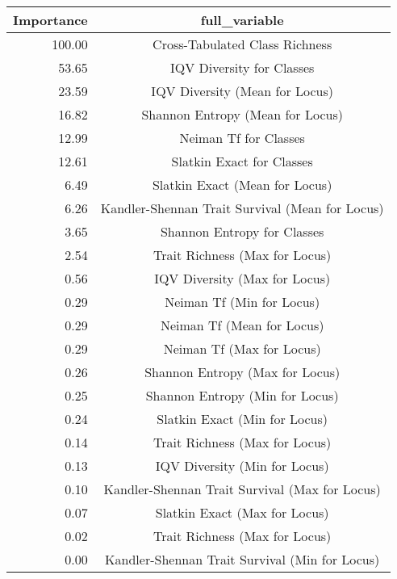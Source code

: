 \begin{tabular}{|r|c|}
  \hline
Importance & full\_variable \\ 
  \hline
100.00 & Cross-Tabulated Class Richness \\ 
  53.65 & IQV Diversity for Classes \\ 
  23.59 & IQV Diversity (Mean for Locus) \\ 
  16.82 & Shannon Entropy (Mean for Locus) \\ 
  12.99 & Neiman Tf for Classes \\ 
  12.61 & Slatkin Exact for Classes \\ 
  6.49 & Slatkin Exact (Mean for Locus) \\ 
  6.26 & Kandler-Shennan Trait Survival (Mean for Locus) \\ 
  3.65 & Shannon Entropy for Classes \\ 
  2.54 & Trait Richness (Max for Locus) \\ 
  0.56 & IQV Diversity (Max for Locus) \\ 
  0.29 & Neiman Tf (Min for Locus) \\ 
  0.29 & Neiman Tf (Mean for Locus) \\ 
  0.29 & Neiman Tf (Max for Locus) \\ 
  0.26 & Shannon Entropy (Max for Locus) \\ 
  0.25 & Shannon Entropy (Min for Locus) \\ 
  0.24 & Slatkin Exact (Min for Locus) \\ 
  0.14 & Trait Richness (Max for Locus) \\ 
  0.13 & IQV Diversity (Min for Locus) \\ 
  0.10 & Kandler-Shennan Trait Survival (Max for Locus) \\ 
  0.07 & Slatkin Exact (Max for Locus) \\ 
  0.02 & Trait Richness (Max for Locus) \\ 
  0.00 & Kandler-Shennan Trait Survival (Min for Locus) \\ 
   \hline
\end{tabular}

